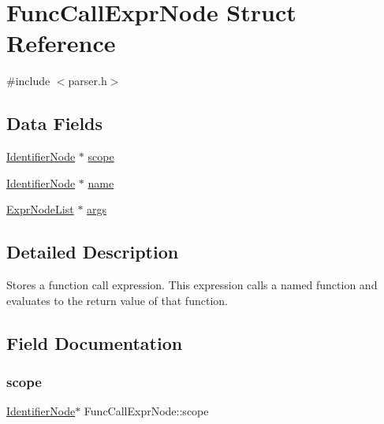 \hypertarget{struct_func_call_expr_node}{}\section{Func\+Call\+Expr\+Node Struct Reference}
\label{struct_func_call_expr_node}


{\ttfamily \#include $<$parser.\+h$>$}

\subsection*{Data Fields}
\begin{DoxyCompactItemize}
\item 
\hyperlink{parser_8h_a930727769b8a8eb0d24d474f3aa12a43}{Identifier\+Node} $\ast$ \hyperlink{struct_func_call_expr_node_ad7e2b32f5fff34ad20936846fa1049b5}{scope}
\item 
\hyperlink{parser_8h_a930727769b8a8eb0d24d474f3aa12a43}{Identifier\+Node} $\ast$ \hyperlink{struct_func_call_expr_node_a2cee7d403ec240f220b3b428bba629ce}{name}
\item 
\hyperlink{struct_expr_node_list}{Expr\+Node\+List} $\ast$ \hyperlink{struct_func_call_expr_node_a559b2108d83b11b46584b85f6fd1b12b}{args}
\end{DoxyCompactItemize}


\subsection{Detailed Description}
Stores a function call expression. This expression calls a named function and evaluates to the return value of that function. 

\subsection{Field Documentation}
\mbox{\label{struct_func_call_expr_node_ad7e2b32f5fff34ad20936846fa1049b5}} 
\subsubsection{\texorpdfstring{scope}{scope}}
{\footnotesize\ttfamily \hyperlink{parser_8h_a930727769b8a8eb0d24d474f3aa12a43}{Identifier\+Node}$\ast$ Func\+Call\+Expr\+Node\+::scope}

